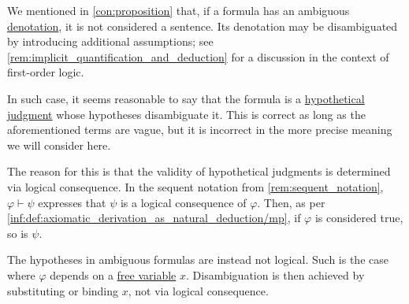 \begin{remark}\label{rem:formulas_and_hypothetical_judgments}
  We mentioned in \cref{con:proposition} that, if a formula has an ambiguous \hyperref[con:denotation]{denotation}, it is not considered a sentence. Its denotation may be disambiguated by introducing additional assumptions; see \cref{rem:implicit_quantification_and_deduction} for a discussion in the context of first-order logic.

  In such case, it seems reasonable to say that the formula is a \hyperref[con:hypothetical_judgment]{hypothetical judgment} whose hypotheses disambiguate it. This is correct as long as the aforementioned terms are vague, but it is incorrect in the more precise meaning we will consider here.

  The reason for this is that the validity of hypothetical judgments is determined via logical consequence. In the sequent notation from \cref{rem:sequent_notation}, \( \varphi \vdash \psi \) expresses that \( \psi \) is a logical consequence of \( \varphi \). Then, as per \ref{inf:def:axiomatic_derivation_as_natural_deduction/mp}, if \( \varphi \) is considered true, so is \( \psi \).

  The hypotheses in ambiguous formulas are instead not logical. Such is the case where \( \varphi \) depends on a \hyperref[con:variable_binding]{free variable} \( x \). Disambiguation is then achieved by substituting or binding \( x \), not via logical consequence.
\end{remark}

